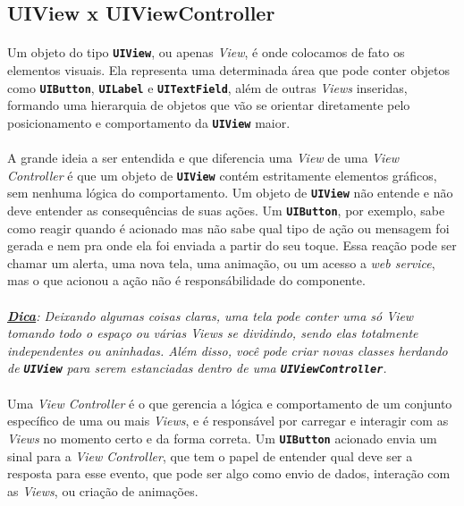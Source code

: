 \documentclass[a4paper,12pt,brazil,doubleside]{book}
\begin{document}
\bigskip

\subsection{UIView x UIViewController}

\paragraph{}Um objeto do tipo \texttt{\textbf{UIView}}, ou apenas \emph{View}, é onde colocamos de fato os elementos visuais. Ela representa uma determinada área que pode conter objetos como \texttt{\textbf{UIButton}}, \texttt{\textbf{UILabel}} e \texttt{\textbf{UITextField}}, além de outras \emph{Views} inseridas, formando uma hierarquia de objetos que vão se orientar diretamente pelo posicionamento e comportamento da \texttt{\textbf{UIView}} maior.
\paragraph{}A grande ideia a ser entendida e que diferencia uma \emph{View} de uma \emph{View Controller} é que um objeto de \texttt{\textbf{UIView}} contém estritamente elementos gráficos, sem nenhuma lógica do comportamento. Um objeto de \texttt{\textbf{UIView}} não entende e não deve entender as consequências de suas ações. Um \texttt{\textbf{UIButton}}, por exemplo, sabe como reagir quando é acionado mas não sabe qual tipo de ação ou mensagem foi gerada e nem pra onde ela foi enviada a partir do seu toque. Essa reação pode ser chamar um alerta, uma nova tela, uma animação, ou um acesso a \emph{web service}, mas o que acionou a ação não é responsábilidade do componente.
\paragraph{}\textit{\textbf{\underline{Dica}}: Deixando algumas coisas claras, uma tela pode conter uma só \emph{View} tomando todo o espaço ou várias \emph{Views} se dividindo, sendo elas totalmente independentes ou aninhadas. Além disso, você pode criar novas classes herdando de \texttt{\textbf{UIView}} para serem estanciadas dentro de uma \texttt{\textbf{UIViewController}}.}
\paragraph{}Uma \emph{View Controller} é o que gerencia a lógica e comportamento de um conjunto específico de uma ou mais \emph{Views}, e é responsável por carregar e interagir com as \emph{Views} no momento certo e da forma correta. Um \texttt{\textbf{UIButton}} acionado envia um sinal para a \emph{View Controller}, que tem o papel de entender qual deve ser a resposta para esse evento, que pode ser algo como envio de dados, interação com as \emph{Views}, ou criação de animações.
\end{document}
